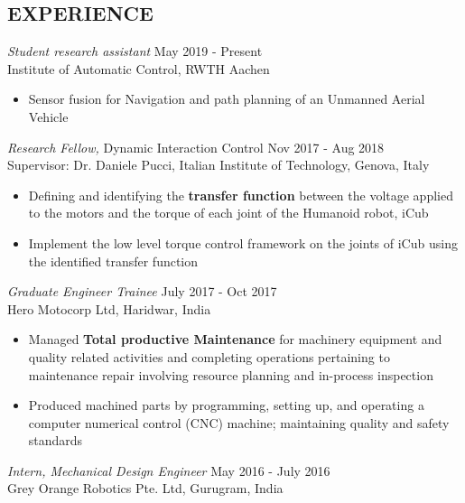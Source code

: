 \documentclass[margin, 10pt]{res} %
\begin{document}
\begin{resume}
\section{EXPERIENCE}

{\sl Student research assistant } \hfill May 2019 - Present \\
Institute of Automatic Control, RWTH Aachen\\
\begin{itemize}
	\item  Sensor fusion for Navigation and path planning of an Unmanned Aerial Vehicle
	
\end{itemize} 

{\sl Research Fellow, }Dynamic Interaction Control \hfill Nov 2017 - Aug 2018 \\
Supervisor: Dr. Daniele Pucci, Italian Institute of Technology, Genova, Italy\\

\begin{itemize}
	\item  Defining and identifying the \textbf{transfer function} between the voltage applied to the motors and the torque of each joint of the Humanoid robot, iCub
	\item  Implement the low level torque control framework on the joints of iCub using the identified transfer function

\end{itemize} 

{\sl Graduate Engineer Trainee} \hfill July 2017 - Oct 2017 \\
Hero Motocorp Ltd, Haridwar, India\\

\begin{itemize}
	\item Managed \textbf{Total productive Maintenance} for machinery
	equipment and quality related activities and completing operations pertaining to maintenance repair
	involving resource planning and in-process inspection
	\item Produced machined parts by programming, setting up, and operating a computer numerical control (CNC) machine;
	maintaining quality and safety standards

	
\end{itemize} 
{\sl Intern, Mechanical Design Engineer} \hfill May 2016 - July 2016 \\
Grey Orange Robotics Pte. Ltd, Gurugram, India\\


\end{resume}
\end{document}

